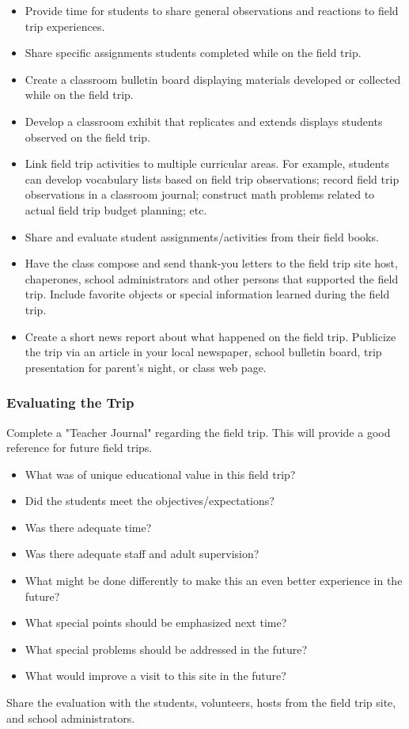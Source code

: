 \begin{itemize}
\item Provide time for students to share general observations and reactions to field trip experiences.
\item Share specific assignments students completed while on the field trip.
\item Create a classroom bulletin board displaying materials developed or collected while on the field
   trip.
\item Develop a classroom exhibit that replicates and extends displays students observed on the field
   trip.
\item Link field trip activities to multiple curricular areas. For example, students can develop
   vocabulary lists based on field trip observations; record field trip observations in a classroom
  journal; construct math problems related to actual field trip budget planning; etc.
\item Share and evaluate student assignments/activities from their field books.
\item Have the class compose and send thank-you letters to the field trip site host, chaperones, school
   administrators and other persons that supported the field trip. Include favorite objects or
  special information learned during the field trip.
\item Create a short news report about what happened on the field trip. Publicize the trip via an
   article in your local newspaper, school bulletin board, trip presentation for parent's night, or
  class web page.
\end{itemize}

\subsubsection*{Evaluating the Trip}
Complete a "Teacher Journal" regarding the field trip. This will provide a good reference for future field
trips.
\begin{itemize}
\item What was of unique educational value in this field trip?
\item Did the students meet the objectives/expectations?
\item Was there adequate time?
\item Was there adequate staff and adult supervision?
\item What might be done differently to make this an even better experience in the future?
\item What special points should be emphasized next time?
\item What special problems should be addressed in the future?
\item What would improve a visit to this site in the future?
\end{itemize}
Share the evaluation with the students, volunteers, hosts from the field trip site, and school
administrators.

